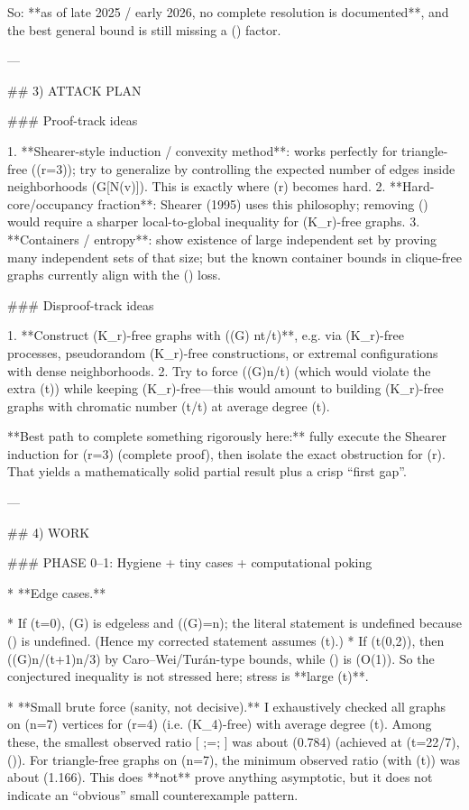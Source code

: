 So: **as of late 2025 / early 2026, no complete resolution is documented**, and the best general bound is still missing a (\log\log) factor.

---

## 3) ATTACK PLAN

### Proof-track ideas

1. **Shearer-style induction / convexity method**: works perfectly for triangle-free ((r=3)); try to generalize by controlling the expected number of edges inside neighborhoods (G[N(v)]). This is exactly where (r) becomes hard.
2. **Hard-core/occupancy fraction**: Shearer (1995) uses this philosophy; removing (\log\log) would require a sharper local-to-global inequality for (K_r)-free graphs.
3. **Containers / entropy**: show existence of large independent set by proving many independent sets of that size; but the known container bounds in clique-free graphs currently align with the (\log\log) loss.

### Disproof-track ideas

1. **Construct (K_r)-free graphs with (\alpha(G) \ll n\log t/t)**, e.g. via (K_r)-free processes, pseudorandom (K_r)-free constructions, or extremal configurations with dense neighborhoods.
2. Try to force (\alpha(G)\approx n/t) (which would violate the extra (\log t)) while keeping (K_r)-free—this would amount to building (K_r)-free graphs with chromatic number (\gg t/\log t) at average degree (t).

**Best path to complete something rigorously here:** fully execute the Shearer induction for (r=3) (complete proof), then isolate the exact obstruction for (r). That yields a mathematically solid partial result plus a crisp “first gap”.

---

## 4) WORK

### PHASE 0–1: Hygiene + tiny cases + computational poking

* **Edge cases.**

  * If (t=0), (G) is edgeless and (\alpha(G)=n); the literal statement is undefined because () is undefined. (Hence my corrected statement assumes (t).)
  * If (t\in(0,2)), then (\alpha(G)\ge n/(t+1)\ge n/3) by Caro–Wei/Turán-type bounds, while () is (O(1)). So the conjectured inequality is not stressed here; stress is **large (t)**.

* **Small brute force (sanity, not decisive).**
  I exhaustively checked all graphs on (n=7) vertices for (r=4) (i.e. (K_4)-free) with average degree (t). Among these, the smallest observed ratio
  [
   ;=; 
  ]
  was about (0.784) (achieved at (t=22/7), ()). For triangle-free graphs on (n=7), the minimum observed ratio (with (t)) was about (1.166).
  This does **not** prove anything asymptotic, but it does not indicate an “obvious” small counterexample pattern.

